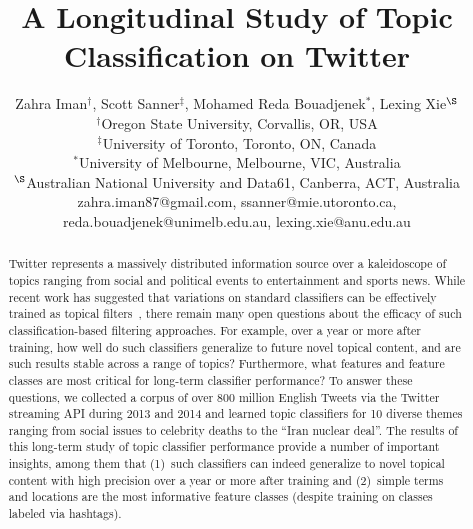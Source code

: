 \documentclass[letterpaper]{article}
\begin{document}
%
\title{A Longitudinal Study of Topic Classification on Twitter}
\author {Zahra Iman$^{\dag}$, Scott Sanner$^{\ddagger}$, Mohamed Reda Bouadjenek$^{*}$, Lexing Xie$^{\S}$\\
	$^{\dag}$Oregon State University, Corvallis, OR, USA\\
	$^{\ddagger}$University of Toronto, Toronto, ON, Canada\\
	$^{*}$University of Melbourne, Melbourne, VIC, Australia\\
	$^{\S}$Australian National University and Data61, Canberra, ACT, Australia\\
	{\footnotesize zahra.iman87@gmail.com, ssanner@mie.utoronto.ca, reda.bouadjenek@unimelb.edu.au, lexing.xie@anu.edu.au}
}
\maketitle
\begin{abstract}
Twitter represents a massively distributed information source over a kaleidoscope of topics ranging from social and political events to entertainment and sports news.  While recent work has suggested that variations on standard classifiers can be effectively trained as topical filters~\cite{lin2011smoothing,yang2014large,magdy}, there remain many open questions about the efficacy of such classification-based filtering approaches.  For example, over a year or more after training, how well do such classifiers generalize to future novel topical content, and are such results stable across a range of topics?  Furthermore, what features and feature classes are most critical for long-term classifier performance?  To answer these questions, we collected a corpus of over 800 million English Tweets via the Twitter streaming API during 2013 and 2014 and learned topic classifiers for 10 diverse themes ranging from social issues to celebrity deaths to the ``Iran nuclear deal''.  The results of this long-term study of topic classifier performance provide a number of important insights, among them that (1)~such classifiers can indeed generalize to novel topical content with high precision over a year or more after training and (2)~simple terms and locations are the most informative feature classes (despite training on classes labeled via hashtags).
\end{abstract}
\end{document}
